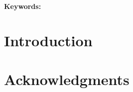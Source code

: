 \documentclass[10pt,letterpaper,twocolumn]{article}
\begin{document}
\title{}

\author{Nikolay Chunosov$^{1,2}$, Flavio Vella$^{1}$, Anton Lokhmotov$^{1}$, Grigori Fursin$^{1,3}$ \\
\\
$^1$~dividiti, UK ; $^2$~Xored, Russia ; $^3$~cTuning foundation, France\\
}

\date{March, 2018}


\maketitle

\begin{abstract}
 
\end{abstract}

{\bf Keywords:}
{\it\small 
 
}



\section{Introduction} %
\label{introduction} %



\section{Acknowledgments}
\label{sec:ack}







\appendix

\clearpage
\newpage
\pagebreak


\end{document}

